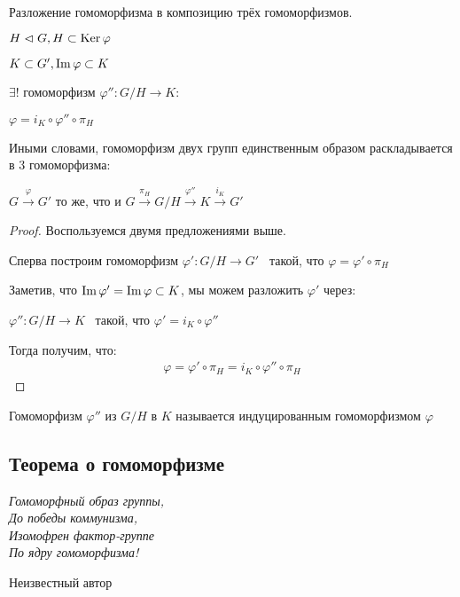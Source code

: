 \begin{theorem-non}
    Разложение гомоморфизма в композицию трёх гомоморфизмов.

    $H \vartriangleleft G, H \subset \operatorname{Ker} \varphi$

    $K \subset G', \operatorname{Im} \varphi \subset K$

    $\exists !$ гомоморфизм $\varphi'': G / H \to K:$

    $\varphi =  i_K \circ \varphi'' \circ \pi_H$

    Иными словами, гомоморфизм двух групп единственным образом раскладывается в 3 гомоморфизма:

    $G \stackrel{\varphi}{\to} G'$ то же, что и $G \stackrel{\pi_{H}}{\to} G/H \stackrel{\varphi''}{\to} K \stackrel{i_{K}}{\to} G'$

    \begin{proof}
        Воспользуемся двумя предложениями выше.

        Сперва построим гомоморфизм $\varphi': G / H \to G'$ \, такой, что $\varphi = \varphi' \circ \pi_H$

        Заметив, что $\operatorname{Im} \varphi' = \operatorname{Im} \varphi \subset K$, мы можем разложить $\varphi'$ через:

        $\varphi'': G / H \to K$ \, такой, что $\varphi' = i_K \circ \varphi''$

        Тогда получим, что: 
        \begin{gather*}
            \varphi = \varphi' \circ \pi_H = i_K \circ \varphi'' \circ \pi_H
        \end{gather*}
    \end{proof}

    \notice Гомоморфизм $\varphi''$ из $G / H$ в $K$ называется индуцированным гомоморфизмом $\varphi$
\end{theorem-non}

\subsection{Теорема о гомоморфизме}

\epigraph{
    \textit{
        Гомоморфный образ группы, \\
        До победы коммунизма, \\
        Изомофрен фактор-группе \\
        По ядру гомоморфизма!
    }
}{Неизвестный автор}
    
